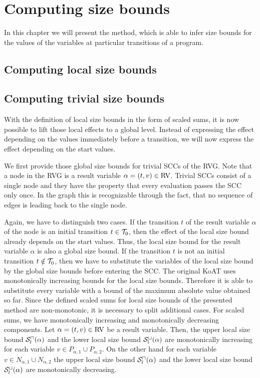 \section{Computing size bounds}

In this chapter we will present the method, which is able to infer size bounds for the values of the variables at particular transitions of a program.


\subsection{Computing local size bounds}




\subsection{Computing trivial size bounds}

With the definition of local size bounds in the form of scaled sums, it is now possible to lift those local effects to a global level.
Instead of expressing the effect depending on the values immediately before a transition, we will now express the effect depending on the start values.

We first provide those global size bounds for trivial SCCs of the RVG.
Note that a node in the RVG is a result variable $\alpha = (t,v) \in \text{RV}$.
Trivial SCCs consist of a single node and they have the property that every evaluation passes the SCC only once.
In the graph this is recognizable through the fact, that no sequence of edges is leading back to the single node.

Again, we have to distinguish two cases.
If the transition $t$ of the result variable $\alpha$ of the node is an initial transition $t \in \mathcal{T}_0$, then the effect of the local size bound already depends on the start values.
Thus, the local size bound for the result variable $\alpha$ is also a global size bound.
If the transition $t$ is not an initial transition $t \notin \mathcal{T}_0$, then we have to substitute the variables of the local size bound by the global size bounds before entering the SCC.
The original KoAT uses monotonically increasing bounds for the local size bounds.
Therefore it is able to substitute every variable with a bound of the maximum absolute value obtained so far.
Since the defined scaled sums for local size bounds of the presented method are non-monotonic, it is necessary to split additional cases.
For scaled sums, we have monotonically increasing and monotonically decreasing components.
Let $\alpha = (t,v) \in \text{RV}$ be a result variable.
Then, the upper local size bound ${\mathcal{S}^\sqcap_l}(\alpha)$ and the lower local size bound ${\mathcal{S}^\sqcup_l}(\alpha)$ are monotonically increasing for each variable $v \in P_{\alpha,1} \cup P_{\alpha,2}$.
On the other hand for each variable $v \in N_{\alpha,1} \cup N_{\alpha,2}$ the upper local size bound ${\mathcal{S}^\sqcap_l}(\alpha)$ and the lower local size bound ${\mathcal{S}^\sqcup_l}(\alpha)$ are monotonically decreasing.

